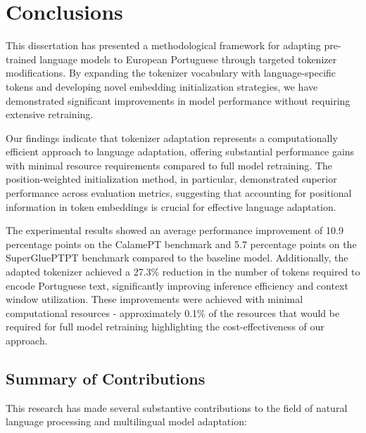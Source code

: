 
\chapter{Conclusions}


\label{chap:conclusions}

This dissertation has presented a methodological framework for adapting pre-trained language models to European Portuguese through targeted tokenizer modifications. By expanding the tokenizer vocabulary with language-specific tokens and developing novel embedding initialization strategies, we have demonstrated significant improvements in model performance without requiring extensive retraining.

Our findings indicate that tokenizer adaptation represents a computationally efficient approach to language adaptation, offering substantial performance gains with minimal resource requirements compared to full model retraining. The position-weighted initialization method, in particular, demonstrated superior performance across evaluation metrics, suggesting that accounting for positional information in token embeddings is crucial for effective language adaptation.

The experimental results showed an average performance improvement of 10.9 percentage points on the CalamePT benchmark and 5.7 percentage points on the SuperGluePTPT benchmark compared to the baseline model. Additionally, the adapted tokenizer achieved a 27.3\% reduction in the number of tokens required to encode Portuguese text, significantly improving inference efficiency and context window utilization. These improvements were achieved with minimal computational resources - approximately 0.1\% of the resources that would be required for full model retraining highlighting the cost-effectiveness of our approach.


\section{Summary of Contributions}
This research has made several substantive contributions to the field of natural language processing and multilingual model adaptation:

